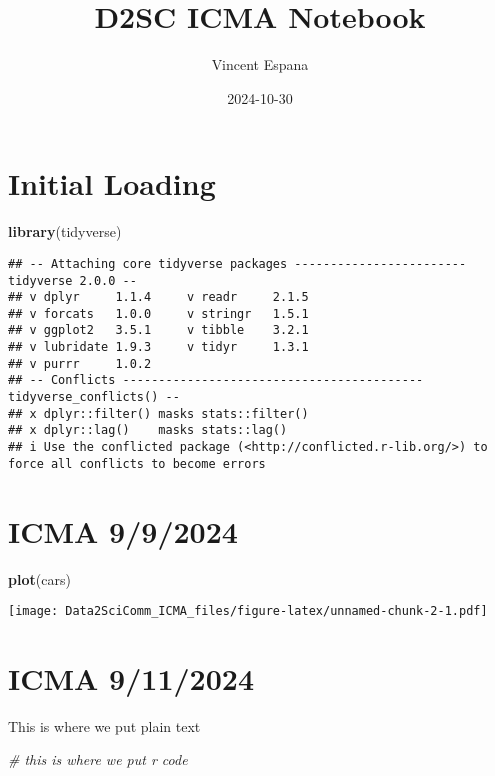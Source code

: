 \documentclass[
]{article}
\title{D2SC ICMA Notebook}
\author{Vincent Espana}
\date{2024-10-30}
\newenvironment{Shaded}{\begin{snugshade}}{\end{snugshade}}
\newcommand{\CommentTok}[1]{\textcolor[rgb]{0.56,0.35,0.01}{\textit{#1}}}
\newcommand{\FunctionTok}[1]{\textcolor[rgb]{0.13,0.29,0.53}{\textbf{#1}}}
\newcommand{\NormalTok}[1]{#1}
\begin{document}
\maketitle

\section{Initial Loading}\label{initial-loading}

\begin{Shaded}
\begin{Highlighting}[]
\FunctionTok{library}\NormalTok{(tidyverse)}
\end{Highlighting}
\end{Shaded}

\begin{verbatim}
## -- Attaching core tidyverse packages ------------------------ tidyverse 2.0.0 --
## v dplyr     1.1.4     v readr     2.1.5
## v forcats   1.0.0     v stringr   1.5.1
## v ggplot2   3.5.1     v tibble    3.2.1
## v lubridate 1.9.3     v tidyr     1.3.1
## v purrr     1.0.2     
## -- Conflicts ------------------------------------------ tidyverse_conflicts() --
## x dplyr::filter() masks stats::filter()
## x dplyr::lag()    masks stats::lag()
## i Use the conflicted package (<http://conflicted.r-lib.org/>) to force all conflicts to become errors
\end{verbatim}

\section{ICMA 9/9/2024}\label{icma-992024}

\begin{Shaded}
\begin{Highlighting}[]
\FunctionTok{plot}\NormalTok{(cars)}
\end{Highlighting}
\end{Shaded}

\texttt{[image: Data2SciComm\_ICMA\_files/figure-latex/unnamed-chunk-2-1.pdf]}

\section{ICMA 9/11/2024}\label{icma-9112024}

This is where we put plain text

\begin{Shaded}
\begin{Highlighting}[]
\CommentTok{\# this is where we put r code}
\end{Highlighting}
\end{Shaded}
\end{document}

